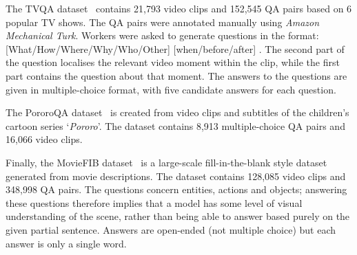 \documentclass[../interim.tex]{subfiles}
\begin{document}
The TVQA dataset~\cite{dataset:tvqa} contains 21,793 video clips and 152,545 QA pairs based on 6 popular TV shows. The QA pairs were annotated manually using \textit{Amazon Mechanical Turk}. Workers were asked to generate questions in the format: [What/How/Where/Why/Who/Other] \underline{\hspace{1cm}} [when/before/after] \underline{\hspace{1cm}}. The second part of the question localises the relevant video moment within the clip, while the first part contains the question about that moment. The answers to the questions are given in multiple-choice format, with five candidate answers for each question.

The PororoQA dataset~\cite{dataset:pororo-qa} is created from video clips and subtitles of the children's cartoon series `\textit{Pororo}'. The dataset contains 8,913 multiple-choice QA pairs and 16,066 video clips.

Finally, the MovieFIB dataset~\cite{dataset:movie-fib} is a large-scale fill-in-the-blank style dataset generated from movie descriptions. The dataset contains 128,085 video clips and 348,998 QA pairs. The questions concern entities, actions and objects; answering these questions therefore implies that a model has some level of visual understanding of the scene, rather than being able to answer based purely on the given partial sentence. Answers are open-ended (not multiple choice) but each answer is only a single word.
\end{document}
